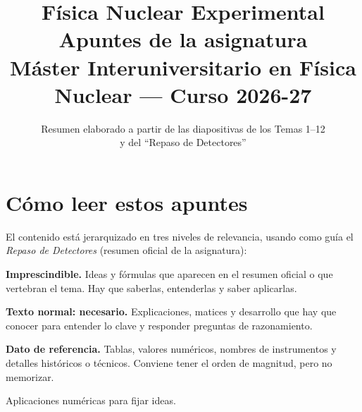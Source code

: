 \documentclass[11pt,a4paper]{report}
\title{\Huge\bfseries Física Nuclear Experimental\\[0.4em]\Large Apuntes de la asignatura\\[0.3em]\large Máster Interuniversitario en Física Nuclear --- Curso 2026-27}
\author{Resumen elaborado a partir de las diapositivas de los Temas 1--12\\y del ``Repaso de Detectores''}
\date{}
\begin{document}
\maketitle

\chapter*{Cómo leer estos apuntes}
El contenido está jerarquizado en tres niveles de relevancia, usando como guía el
\emph{Repaso de Detectores} (resumen oficial de la asignatura):

\begin{clave}
\textbf{Imprescindible.} Ideas y fórmulas que aparecen en el resumen oficial o que vertebran el tema.
Hay que saberlas, entenderlas y saber aplicarlas.
\end{clave}

\textbf{Texto normal: necesario.} Explicaciones, matices y desarrollo que hay que conocer para
entender lo clave y responder preguntas de razonamiento.

\begin{dato}
\textbf{Dato de referencia.} Tablas, valores numéricos, nombres de instrumentos y detalles
históricos o técnicos. Conviene tener el orden de magnitud, pero no memorizar.
\end{dato}

\begin{ejemplo}
Aplicaciones numéricas para fijar ideas.
\end{ejemplo}

\tableofcontents








\setcounter{chapter}{6}

\setcounter{chapter}{8}




\end{document}
